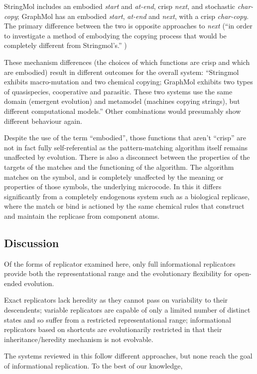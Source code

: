 StringMol includes an embodied \emph{start} and \emph{at-end}, crisp \emph{next}, and stochastic \emph{char-copy}; GraphMol has an embodied \emph{start}, \emph{at-end} and \emph{next}, with a crisp \emph{char-copy}. The primary difference between the two is opposite approaches to \emph{next} (``in order to investigate a method of embodying the copying process that would be completely different from Stringmol's.'' \parencite[p.145]{Nellis2012})

These mechanism differences (the choices of which functions are crisp and which are embodied) result in different outcomes for the overall system: ``Stringmol exhibits macro-mutation and two chemical copying; GraphMol exhibits two types of quasispecies, cooperative and parasitic. These two systems use the same domain (emergent evolution) and metamodel (machines copying strings), but different computational models.'' Other combinations would presumably show different behaviour again.

Despite the use of the term ``embodied'', those functions that aren't ``crisp'' are not in fact fully self-referential as the pattern-matching algorithm itself remains unaffected by evolution. There is also a disconnect between the properties of the targets of the matches and the functioning of the algorithm. The algorithm matches on the symbol, and is completely unaffected by the meaning or properties of those symbols, the underlying microcode. In this it differs significantly from a completely endogenous system such as a biological replicase, where the match or bind is actioned by the same chemical rules that construct and maintain the replicase from component atoms.

\subsection{Discussion}

Of the forms of replicator examined here, only full informational replicators provide both the representational range and the evolutionary flexibility for open-ended evolution. 

Exact replicators lack heredity as they cannot pass on variability to their descendents; variable replicators are capable of only a limited number of distinct states and so suffer from a restricted representational range; informational replicators based on shortcuts are evolutionarily restricted in that their inheritance/heredity mechanism is not evolvable. 

The systems reviewed in this  follow different approaches, but none reach the goal of informational replication. To the best of our knowledge, 

